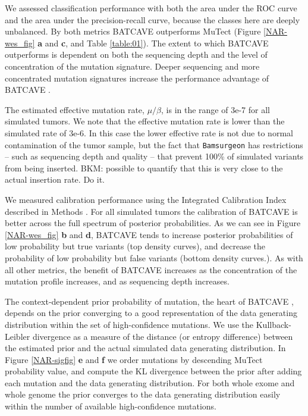 \documentclass[a4,center,fleqn]{NAR}
\newcommand{\bkmcomment}[1]{{\color{blue}BKM: #1}}
\newcommand{\batcave}{BATCAVE }
\begin{document}
We assessed classification performance with both the area under the ROC curve and the area under the precision-recall curve, because the classes here are deeply unbalanced.
By both metrics \batcave outperforms MuTect (Figure \ref{NAR-wes_fig} \textbf{a} and \textbf{c}, and Table \ref{table:01}).
The extent to which \batcave outperforms is dependent on both the sequencing depth and the level of concentration of the mutation signature.
Deeper sequencing and more concentrated mutation signatures increase the performance advantage of \batcave. 

The estimated effective mutation rate, $\mu/\beta$, is in the range of 3e-7 for all simulated tumors.
We note that the effective mutation rate is lower than the simulated rate of 3e-6.
In this case the lower effective rate is not due to normal contamination of the tumor sample, but the fact that \texttt{Bamsurgeon} has restrictions -- such as sequencing depth and quality -- that prevent 100\% of simulated variants from being inserted. 
\bkmcomment{possible to quantify that this is very close to the actual insertion rate. Do it}.

We measured calibration performance using the Integrated Calibration Index described in Methods \citep{Austin2019}.
For all simulated tumors the calibration of \batcave is better across the full spectrum of posterior probabilities.
As we can see in Figure \ref{NAR-wes_fig} \textbf{b} and \textbf{d}, \batcave tends to increase posterior probabilities of low probability but true variants (top density curves), and decrease the probability of low probability but false variants (bottom density curves.).
As with all other metrics, the benefit of \batcave increases as the concentration of the mutation profile increases, and as sequencing depth increases.

The context-dependent prior probability of mutation, the heart of \batcave, depends on the prior converging to a good representation of the data generating distribution within the set of high-confidence mutations.
We use the Kullback-Leibler divergence as a measure of the distance (or entropy difference) between the estimated prior and the actual simulated data generating distribution.
In Figure \ref{NAR-sigfig} \textbf{e} and \textbf{f} we order mutations by descending MuTect probability value, and compute the KL divergence between the prior after adding each mutation and the data generating distribution.
For both whole exome and whole genome the prior converges to the data generating distribution easily within the number of available high-confidence mutations. 
\end{document}
